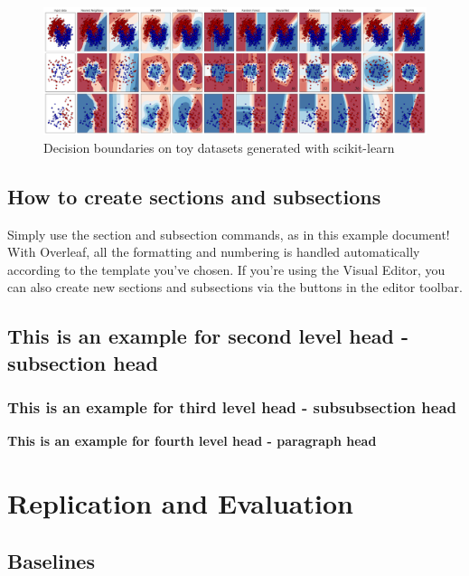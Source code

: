 \documentclass[a4paper]{article}
\newcommand{\subsubsubsection}[1]{%
  \vspace{\baselineskip}%
  \noindent\textbf{#1\\}\quad%
}
\begin{document}
\begin{figure}[!ht]
  \centering
  \includegraphics[width=0.8\linewidth]{figures/classifier_decision_boundary.png}
  \caption{\label{fig:classifier_decision_boundary} Decision boundaries on toy datasets generated with scikit-learn}
  \end{figure}
  
% 
\subsection{How to create sections and subsections}
Simply use the section and subsection commands, as in this example document! With Overleaf, all the formatting and numbering is handled automatically according to the template you've chosen. If you're using the Visual Editor, you can also create new sections and subsections via the buttons in the editor toolbar.

\subsection{This is an example for second level head - subsection head}\label{subsec1}
\lipsum[5]

\subsubsection{This is an example for third level head - subsubsection head}\label{subsubsec1}
\lipsum[6]

\subsubsubsection{This is an example for fourth level head - paragraph head}
\lipsum[7]


\section{Replication and Evaluation}\label{sec3}

\subsection{Baselines}\label{subsec2}
\end{document}

